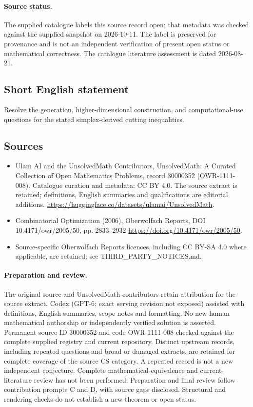 \documentclass[11pt]{article}
\begin{document}
\paragraph{Source status.}
The supplied catalogue labels this source record open; that metadata was checked against the supplied snapshot on 2026-10-11. The label is preserved for provenance and is not an independent verification of present open status or mathematical correctness. The catalogue literature assessment is dated 2026-08-21.
\subsection{Short English statement}
Resolve the generation, higher-dimensional construction, and computational-use questions for the stated simplex-derived cutting inequalities.
\subsection{Sources}
\begin{itemize}
\item[\hypertarget{source:30000352:1}{S1}] Ulam AI and the UnsolvedMath Contributors, UnsolvedMath: A Curated Collection of Open Mathematics Problems, record 30000352 (OWR-1111-008). Catalogue curation and metadata: CC BY 4.0. The source extract is retained; definitions, English summaries and qualifications are editorial additions.
\url{https://huggingface.co/datasets/ulamai/UnsolvedMath}.
\item[\hypertarget{source:30000352:2}{S2}] Combinatorial Optimization (2006), Oberwolfach Reports, DOI 10.4171/owr/2005/50, pp. 2833--2932
\url{https://doi.org/10.4171/owr/2005/50}.
\item Source-specific Oberwolfach Reports licences, including CC BY-SA 4.0 where applicable, are retained; see THIRD\_PARTY\_NOTICES.md.
\end{itemize}
\paragraph{Preparation and review.}
The original source and UnsolvedMath contributors retain attribution for the source extract. Codex (GPT-6; exact serving revision not exposed) assisted with definitions, English summaries, scope notes and formatting. No new human mathematical authorship or independently verified solution is asserted. Permanent source ID 30000352 and code OWR-1111-008 checked against the complete supplied registry and current repository. Distinct upstream records, including repeated questions and broad or damaged extracts, are retained for complete coverage of the source CS category. A repeated record is not a new independent conjecture. Complete mathematical-equivalence and current-literature review has not been performed. Preparation and final review follow contribution prompts C and D, with source gaps disclosed. Structural and rendering checks do not establish a new theorem or open status.
\label{end:30000352}
\end{document}
